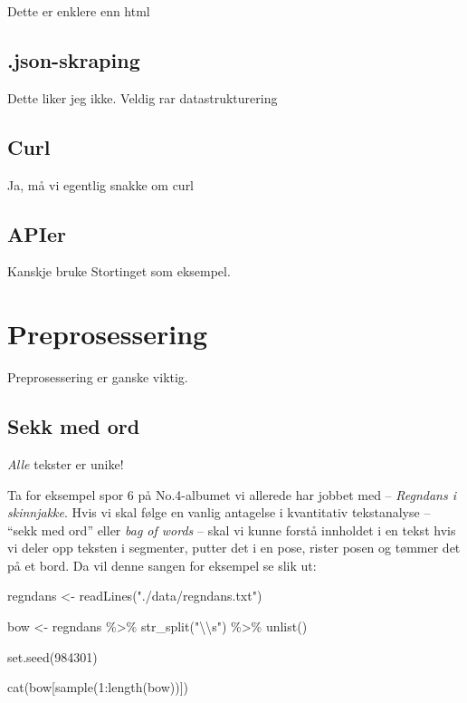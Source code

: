 \documentclass[
]{book}
\newenvironment{Shaded}{\begin{snugshade}}{\end{snugshade}}
\newcommand{\DecValTok}[1]{\textcolor[rgb]{0.00,0.00,0.81}{#1}}
\newcommand{\FunctionTok}[1]{\textcolor[rgb]{0.00,0.00,0.00}{#1}}
\newcommand{\NormalTok}[1]{#1}
\newcommand{\OtherTok}[1]{\textcolor[rgb]{0.56,0.35,0.01}{#1}}
\newcommand{\SpecialCharTok}[1]{\textcolor[rgb]{0.00,0.00,0.00}{#1}}
\newcommand{\StringTok}[1]{\textcolor[rgb]{0.31,0.60,0.02}{#1}}
\begin{document}
Dette er enklere enn html

\hypertarget{json-skraping}{%
\section{.json-skraping}\label{json-skraping}}

Dette liker jeg ikke. Veldig rar datastrukturering

\hypertarget{curl}{%
\section{Curl}\label{curl}}

Ja, må vi egentlig snakke om curl

\hypertarget{apier}{%
\section{APIer}\label{apier}}

Kanskje bruke Stortinget som eksempel.

\hypertarget{prepros}{%
\chapter{Preprosessering}\label{prepros}}

Preprosessering er ganske viktig.

\hypertarget{sekk-med-ord}{%
\section{Sekk med ord}\label{sekk-med-ord}}

\emph{Alle} tekster er unike!

Ta for eksempel spor 6 på No.4-albumet vi allerede har jobbet med -- \emph{Regndans i skinnjakke}. Hvis vi skal følge en vanlig antagelse i kvantitativ tekstanalyse -- ``sekk med ord'' eller \emph{bag of words} -- skal vi kunne forstå innholdet i en tekst hvis vi deler opp teksten i segmenter, putter det i en pose, rister posen og tømmer det på et bord. Da vil denne sangen for eksempel se slik ut:

\begin{Shaded}
\begin{Highlighting}[]
\NormalTok{regndans }\OtherTok{\textless{}{-}} \FunctionTok{readLines}\NormalTok{(}\StringTok{"./data/regndans.txt"}\NormalTok{)}

\NormalTok{bow }\OtherTok{\textless{}{-}}\NormalTok{ regndans }\SpecialCharTok{\%\textgreater{}\%}
    \FunctionTok{str\_split}\NormalTok{(}\StringTok{"}\SpecialCharTok{\textbackslash{}\textbackslash{}}\StringTok{s"}\NormalTok{) }\SpecialCharTok{\%\textgreater{}\%}
    \FunctionTok{unlist}\NormalTok{()}

\FunctionTok{set.seed}\NormalTok{(}\DecValTok{984301}\NormalTok{)}

\FunctionTok{cat}\NormalTok{(bow[}\FunctionTok{sample}\NormalTok{(}\DecValTok{1}\SpecialCharTok{:}\FunctionTok{length}\NormalTok{(bow))])}
\end{Highlighting}
\end{Shaded}
\end{document}
